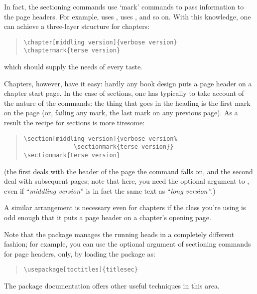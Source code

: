 In fact, the sectioning commands use `mark' commands to pass
information to the page headers.  For example,  uses
,  uses , and so on.  With
this knowledge, one can achieve a three-layer structure for chapters:
\begin{quote}
\begin{verbatim}
\chapter[middling version]{verbose version}
\chaptermark{terse version}
\end{verbatim}
\end{quote}
which should supply the needs of every taste.

Chapters, however, have it easy: hardly any book design puts a page
header on a chapter start page.  In the case of sections, one has
typically to take account of the nature of the  commands:
the thing that goes in the heading is the first mark on the page (or,
failing any mark, the last mark on any previous page).  As a result
the recipe for sections is more tiresome:
\begin{quote}
\begin{verbatim}
\section[middling version]{verbose version%
              \sectionmark{terse version}}
\sectionmark{terse version}
\end{verbatim}
\end{quote}
(the first  deals with the header of the page the
 command falls on, and the second deal with subsequent
pages; note that here, you need the optional argument to ,
even if ``\emph{middling version}'' is in fact the same text as
``\emph{long version''}.)

A similar arrangement is necessary even for chapters if the class
you're using is odd enough that it puts a page header on a chapter's
opening page.

Note that the  package manages the running heads in
a completely different fashion; for example, you can use the optional
argument of sectioning commands for page headers, only, by loading the
package as:
\begin{quote}
\begin{verbatim}
\usepackage[toctitles]{titlesec}
\end{verbatim}
\end{quote}
The package documentation offers other useful techniques in this area.


